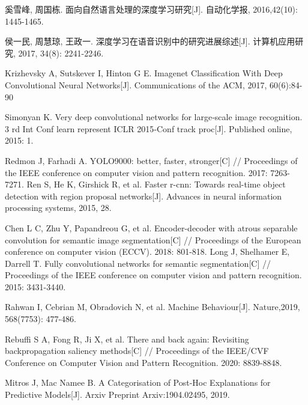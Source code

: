



\begin{thebibliography}{200}
\wuhao %
\linespread{1}\selectfont
\setlength{\itemsep}{-1.4ex} %
\thispagestyle{others}
\pagestyle{others}

\makeatletter
\renewcommand\@biblabel[1]{[#1]\hfill} %
\makeatother
\setlength{\labelsep}{0cm}

奚雪峰, 周国栋. 面向自然语言处理的深度学习研究[J]. 自动化学报, 2016,42(10): 1445-1465.

侯一民, 周慧琼, 王政一. 深度学习在语音识别中的研究进展综述[J]. 计算机应用研究, 2017, 34(8): 2241-2246.

Krizhevsky A, Sutskever I, Hinton G E. Imagenet Classification With Deep Convolutional Neural Networks[J]. Communications of the ACM, 2017, 60(6):84-90

Simonyan K. Very deep convolutional networks for large‐scale image recognition. 3 rd Int Conf learn represent ICLR 2015‐Conf track proc[J]. Published online, 2015: 1.

Redmon J, Farhadi A. YOLO9000: better, faster, stronger[C] // Proceedings of the IEEE conference on computer vision and pattern recognition. 2017: 7263-7271.
Ren S, He K, Girshick R, et al. Faster r-cnn: Towards real-time object detection with region proposal networks[J]. Advances in neural information processing systems, 2015, 28.

Chen L C, Zhu Y, Papandreou G, et al. Encoder-decoder with atrous separable convolution for semantic image segmentation[C] // Proceedings of the European conference on computer vision (ECCV). 2018: 801-818.
Long J, Shelhamer E, Darrell T. Fully convolutional networks for semantic segmentation[C] // Proceedings of the IEEE conference on computer vision and pattern recognition. 2015: 3431-3440.

Rahwan I, Cebrian M, Obradovich N, et al. Machine Behaviour[J]. Nature,2019, 568(7753): 477-486.

Rebuffi S A, Fong R, Ji X, et al. There and back again: Revisiting backpropagation saliency methods[C] // Proceedings of the IEEE/CVF Conference on Computer Vision and Pattern Recognition. 2020: 8839-8848.

Mitros J, Mac Namee B. A Categorisation of Post-Hoc Explanations for Predictive Models[J]. Arxiv Preprint Arxiv:1904.02495, 2019.


\end{thebibliography}
